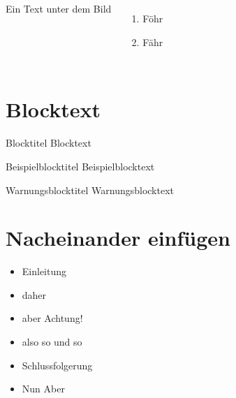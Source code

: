 \begin{frame}
  \begin{columns}
		\newline Ein Text unter dem Bild
                \begin{enumerate}
                \item Föhr
                \item Fähr
                \end{enumerate}
\end{columns}

\end{frame}


\section{Blocktext}

\begin{frame}[t]
    \begin{block}{Blocktitel}
        Blocktext
  \end{block}

  \begin{exampleblock}{Beispielblocktitel}
        Beispielblocktext
  \end{exampleblock}

  \begin{alertblock}{Warnungsblocktitel}
        Warnungsblocktext
  \end{alertblock}
\end{frame}


\section{Nacheinander einfügen}

\begin{frame}

  \begin{itemize}
	  \item Einleitung
	  \item<2-> daher
	  \item<alert@3> aber Achtung!
	  \item<3-> also so und so
	  \item<4-> Schlussfolgerung
	  \item<5|alert@3> Nun Aber
  \end{itemize}

\end{frame}


